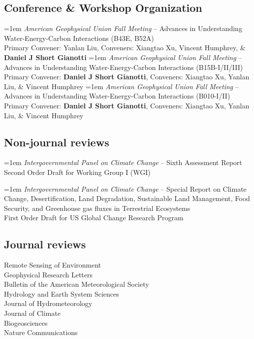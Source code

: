\documentclass[10pt, a4paper]{article}
\renewcommand{\emph}[1]{\textit{#1}}
\newcommand{\years}[1]{\mbox{}\marginnote{\scriptsize #1}} %
\begin{document}
\subsection*{Conference \& Workshop Organization}
\years{2023}\hangindent=1em \emph{American Geophysical Union Fall Meeting} -- Advances in Understanding Water-Energy-Carbon Interactions (B43E, B52A)\\ 
Primary Convener: Yanlan Liu, Conveners: Xiangtao Xu, Vincent Humphrey, \& \textbf{Daniel J Short Gianotti}
\years{2022}\hangindent=1em \emph{American Geophysical Union Fall Meeting} -- Advances in Understanding Water-Energy-Carbon Interactions (B15B-I/II/III)\\ 
Primary Convener: \textbf{Daniel J Short Gianotti}, Conveners: Xiangtao Xu, Yanlan Liu, \& Vincent Humphrey
\years{2021}\hangindent=1em \emph{American Geophysical Union Fall Meeting} -- Advances in Understanding Water-Energy-Carbon Interactions (B010-I/II)\\ 
Primary Convener: \textbf{Daniel J Short Gianotti}, Conveners: Xiangtao Xu, Yanlan Liu, \& Vincent Humphrey
		
\subsection*{Non-journal reviews}
\years{2020}\hangindent=1em \emph{Intergovernmental Panel on Climate Change} -- Sixth Assessment Report \\
Second Order Draft for Working Group I (WGI)
		
\years{2018} \hangindent=1em \emph{Intergovernmental Panel on Climate Change} -- Special Report on Climate Change, Desertification, Land Degradation, Sustainable Land Management, Food Security, and Greenhouse gas fluxes in Terrestrial Ecosystems \\
First Order Draft for US Global Change Research Program

\subsection*{Journal reviews}
Remote Sensing of Environment\\
Geophysical Research Letters\\
Bulletin of the American Meteorological Society\\
Hydrology and Earth System Sciences\\
Journal of Hydrometeorology\\
Journal of Climate\\
Biogeosciences\\
Nature Communications
\end{document}
